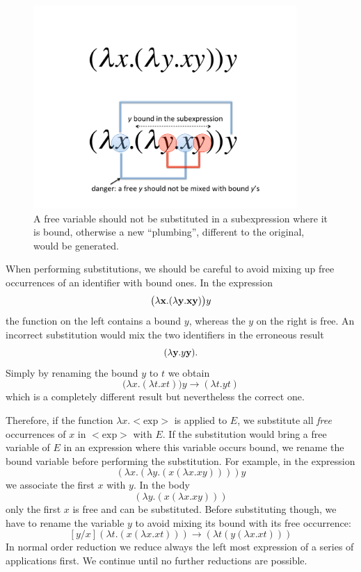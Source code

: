 \documentclass[12pt]{article}
\begin{document}
\begin{figure}[htb]
\centerline{\includegraphics[width=10cm]{lamb4}}
\caption{A free variable should not be substituted in a subexpression where it is bound, otherwise a new ``plumbing'', different to the original, would be generated.\label{fig4}}
\end{figure} 

When performing substitutions, we should be careful  to avoid mixing up free occurrences of an identifier with bound ones. In the expression $$\bigl(\lambda {\bf x}.(\lambda {\bf y}.{\bf x}{\bf y})\bigr)y$$ the function on the left contains a bound $y$, whereas the $y$ on the right is free. An incorrect substitution would mix the two identifiers in the erroneous result $$(\lambda {\bf y}.y{\bf y}).$$ Simply by renaming the bound $y$ to $t$ we obtain $$\bigl(\lambda x.(\lambda t.xt)\bigr)y \rightarrow (\lambda t.yt)$$
which is a completely different result but nevertheless the correct one. 

Therefore, if the function $\lambda x.<\mbox{exp}>$ is applied to $E$, we substitute all {\it free\/} occurrences of $x$ in $<\mbox{exp}>$ with $E$. If the substitution would bring a free variable of $E$ in an expression where this variable occurs bound, we rename the bound variable before performing the substitution. For example, in the expression
$$
\left(\lambda x.(\lambda y.(x(\lambda x.xy)))\right)y
$$
we associate the first $x$ with $y$. In the body
$$\left(\lambda y.(x(\lambda x.xy))\right)$$
only the first $x$ is free and can be substituted. Before substituting though, we have to rename the variable $y$ to avoid mixing its bound with its free occurrence:
$$
[y/x]\left(\lambda t.(x(\lambda x.xt))\right) \rightarrow \left(\lambda t(y(\lambda x.xt))\right)
$$
In normal order reduction we reduce always the left most expression of a series of applications first. We continue until no further reductions are possible.
\end{document}
